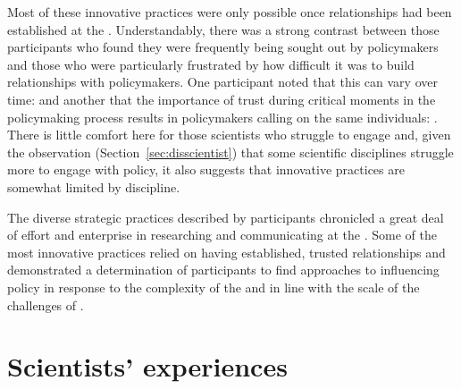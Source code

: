 Most of these innovative practices were only possible once relationships had been established at the \SPI{}. Understandably, there was a strong contrast between those participants who found they were frequently being sought out by policymakers and those who were particularly frustrated by how difficult it was to build relationships with policymakers. One participant noted that this can vary over time:  and another that the importance of trust during critical moments in the policymaking process results in policymakers calling on the same individuals: . There is little comfort here for those scientists who struggle to engage and, given the observation (Section~\ref{sec:disscientist}) that some scientific disciplines struggle more to engage with policy, it also suggests that innovative practices are somewhat limited by discipline.


The diverse strategic practices described by participants chronicled a great deal of effort and enterprise in researching and communicating at the \SPI. Some of the most innovative practices relied on having established, trusted relationships and demonstrated a determination of participants to find approaches to influencing policy in response to the complexity of the \SPI{} and in line with the scale of the challenges of \CAN.

\section{Scientists' experiences}\label{sec:disexperience}

